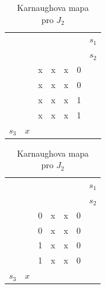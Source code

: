 \begin{table}[!htb]
\begin{minipage}{.5\linewidth}
      \caption{Karnaughova mapa\\ pro $K_1$}
      \centering
    \begin{tabular}{lllllll}
      			       &       					 &       				 & \colorbox{yellow}{} &	\colorbox{yellow}{}&         &$s_1$ \\
    		 	       &        					&\colorbox{red}{}        & \colorbox{red}{}    & 				      &         &$s_2$     \\
    		 	       &        					& x   				 & x    				   & x     				& 0       &  \\
              	       & \colorbox{black}{}       & x     				 & x    				   & x   		  			& 0       &  \\
\colorbox{blue}{}& \colorbox{black}{}       & x    				 & x     				   & x     				& 1       &  \\
\colorbox{blue}{}&       					 & x   				 & x				  	   & x    					& 1       &  \\
    	  $ s_3$ 	& $x$  					&     				 &       				   &       				  	 &          &  \\
    \end{tabular}%
  \end{minipage}%
    \begin{minipage}{.5\linewidth}
      \centering
        \caption{Karnaughova mapa\\ pro $J_2$}
    \begin{tabular}{lllllll}
      			       &       					 &       				 & \colorbox{yellow}{} &	\colorbox{yellow}{}&         &$s_1$ \\
    		 	       &        					&\colorbox{red}{}        & \colorbox{red}{}    & 				      &         &$s_2$     \\
    		 	       &        					& 0    				 & x    				   & x     				& 0       &  \\
              	       & \colorbox{black}{}       & 0     				 & x    				   & x   		  			& 0       &  \\
\colorbox{blue}{}& \colorbox{black}{}       & 1    				 & x     				   & x     				& 0       &  \\
\colorbox{blue}{}&       					 & 1   				 & x				  	   & x    					& 0       &  \\
    	  $ s_3$ 	& $x$  					&     				 &       				   &       				  	 &          &  \\
    \end{tabular}%
  \end{minipage} 

   
  \label{tab:addlabel}%
\end{table}%



